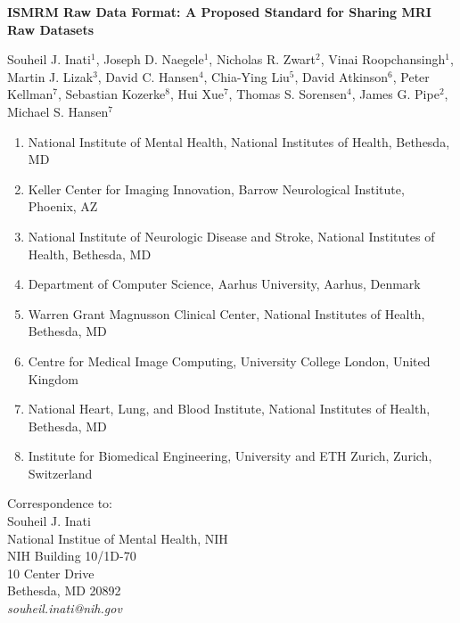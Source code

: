 \documentclass[12pt]{article}
\begin{document}
\chead{}
\rhead{\thepage}
\lfoot{}
\cfoot{}
\rfoot{}

\newpage
\clearpage
\pagestyle{empty}
\vspace*{20mm}

\begin{center}
\large \textbf{ISMRM Raw Data Format: A Proposed Standard for Sharing MRI Raw Datasets}

\normalsize
\singlespacing
Souheil J. Inati$^1$,
Joseph D. Naegele$^1$, 
Nicholas R. Zwart$^2$,
Vinai Roopchansingh$^1$,
Martin J. Lizak$^3$,
David C. Hansen$^4$,
Chia-Ying Liu$^5$,
David Atkinson$^6$,
Peter Kellman$^7$,
Sebastian Kozerke$^8$,
Hui Xue$^7$,
Thomas S. Sorensen$^4$,
James G. Pipe$^2$,
Michael S. Hansen$^7$
\end{center}

\begin{enumerate}
\item National Institute of Mental Health, National Institutes of Health, Bethesda, MD
\item Keller Center for Imaging Innovation, Barrow Neurological Institute, Phoenix, AZ
\item National Institute of Neurologic Disease and Stroke, National Institutes of Health, Bethesda, MD
\item Department of Computer Science, Aarhus University, Aarhus, Denmark
\item Warren Grant Magnusson Clinical Center, National Institutes of Health, Bethesda, MD
\item Centre for Medical Image Computing, University College London, United Kingdom
\item National Heart, Lung, and Blood Institute, National Institutes of Health, Bethesda, MD
\item Institute for Biomedical Engineering, University and ETH Zurich, Zurich, Switzerland
\end{enumerate}

\vspace{5mm}
Correspondence to: \\
Souheil J. Inati \\
National Institue of Mental Health, NIH \\
NIH Building 10/1D-70 \\
10 Center Drive \\
Bethesda, MD 20892 \\
\textit{souheil.inati@nih.gov} \\
\end{document}
